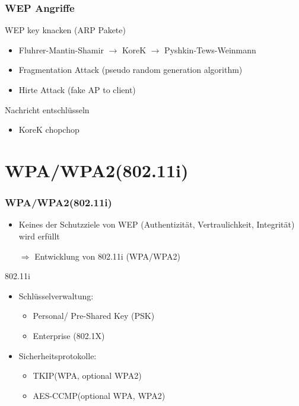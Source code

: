 \documentclass{beamer}
\begin{document}
\begin{frame}
\frametitle{WEP Angriffe}
\begin{block}{WEP key knacken (ARP Pakete)}
\begin{itemize}
	\item Fluhrer-Mantin-Shamir $\rightarrow$ KoreK $\rightarrow$ Pyshkin-Tews-Weinmann
	\item Fragmentation Attack (pseudo random generation algorithm)
	\item Hirte Attack (fake AP to client)
\end{itemize}
\end{block}
\begin{block}{Nachricht entschlüsseln}
\begin{itemize}
	\item KoreK chopchop
\end{itemize}
\end{block}
\end{frame}



\section{WPA/WPA2(802.11i)}
\begin{frame}
\frametitle{WPA/WPA2(802.11i)}
\begin{itemize}
	\item Keines der Schutzziele von WEP (Authentizität, Vertraulichkeit, Integrität) wird erfüllt
	\item[$\Rightarrow$] Entwicklung von 802.11i (WPA/WPA2)
\end{itemize}
\begin{block}{802.11i}
\begin{itemize}
	\item Schlüsselverwaltung:
	\begin{itemize}
		\item Personal/ Pre-Shared Key (PSK)
		\item Enterprise (802.1X)
	\end{itemize}
	\item Sicherheitsprotokolle:
	\begin{itemize}
		\item TKIP(WPA, optional WPA2)
		\item AES-CCMP(optional WPA, WPA2)
	\end{itemize}
\end{itemize}
\end{block}
\end{frame}
\end{document}
